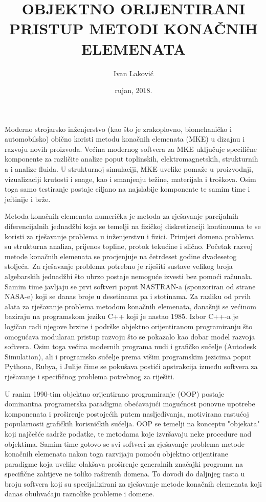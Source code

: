 \documentclass[a4paper,twoside,12pt]{memoir} %
\title{OBJEKTNO ORIJENTIRANI PRISTUP METODI KONAČNIH ELEMENATA}
\author{Ivan Laković}
\date{rujan, 2018.}  %
\begin{document}
\frontmatter


\begin{intro}
Moderno strojarsko inženjerstvo (kao što je zrakoplovno, biomehaničko i automobilsko) obično koristi metodu konačnih elemenata (MKE) u dizajnu i razvoju novih proizvoda. Većina modernog softvera za MKE uključuje specifične komponente za različite analize poput toplinskih, elektromagnetskih, strukturnih a i analize fluida. U strukturnoj simulaciji, MKE uvelike pomaže u proizvodnji, vizualizaciji krutosti i snage, kao i smanjenju težine, materijala i troškova. Osim toga samo testiranje postaje ciljano na najslabije komponente te samim time i jeftinije i brže. \cite{wiki_fem_18} \par

Metoda konačnih elemenata numerička je metoda za rješavanje parcijalnih diferencijalnih jednadžbi koja se temelji na fizičkoj diskretizaciji kontinuuma te se koristi za rješavanje problema u inženjerstvu i fizici. Primjeri domena problema su strukturna analiza, prijenos topline, protok tekućine i slično. Početak razvoj metode konačnih elemenata se procjenjuje na četrdeset godine dvadesetog stoljeća. Za rješavanje problema potrebno je riješiti sustave velikog broja algebarskih jednadžbi što ubrzo postaje nemoguće izvesti bez pomoći računala. Samim time javljaju se prvi softveri poput NASTRAN-a (sponzoriran od strane NASA-e) koji se danas broje u desetinama pa i stotinama. Za razliku od prvih alata za rješavanje problema metodom konačnih elemenata, današnji se većinom baziraju na programskom jeziku C++ koji je nastao 1985. Izbor C++-a je logičan radi njegove brzine i podrške objektno orijentiranom programiranju što omogućava modularan pristup razvoju što se pokazalo kao dobar model razvoja softvera.
Osim toga većina modernih programa nudi i grafičko sučelje (Autodesk Simulation), ali i programsko sučelje prema višim programskim jezicima poput Pythona, Rubya, i Julije čime se pokušava postići apstrakcija između softvera za rješavanje i specifičnog problema potrebnog za riješiti. \cite{wiki_list_of_fem_software} \par

U ranim 1990-tim objektno orijentirano programiranje (OOP) postaje dominantna programerska paradigma obećavajući mogućnost ponovne upotrebe komponenata i proširenje postojećih putem nasljeđivanja, motivirana rastućoj popularnosti grafičkih korisničkih sučelja. OOP se temelji na konceptu "objekata" koji najčešće sadrže podatke, te metodama koje izvršavaju neke procedure nad objektima. Samim time gotovo se svi softveri za rješavanje problema metode konačnih elemenata nakon toga razvijaju pomoću objektno orijentirane paradigme koja uvelike olakšava proširenje generalnih značajki programa na specifične zahtjeve ne toliko raširenih domena. To dovodi do daljnjeg rasta u broju softvera koji su specijalizirani za rješavanje metode konačnih elemenata koji danas obuhvaćaju raznolike probleme i domene. \par


\end{intro}
\end{document}
